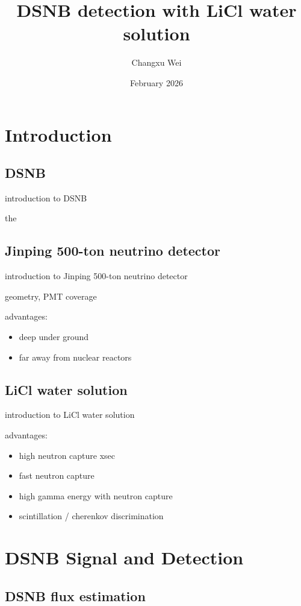 \documentclass[12pt]{article}
\title{DSNB detection with LiCl water solution}
\author{Changxu Wei}
\date{February 2026}
\begin{document}
\maketitle

\newpage
\tableofcontents

\newpage
\section{Introduction}
\subsection{DSNB}
introduction to DSNB

the

\subsection{Jinping 500-ton neutrino detector}
introduction to Jinping 500-ton neutrino detector

geometry, PMT coverage

advantages:
\begin{itemize}
    \item deep under ground
    \item far away from nuclear reactors
\end{itemize}

\subsection{LiCl water solution}
introduction to LiCl water solution

advantages:
\begin{itemize}
    \item high neutron capture xsec
    \item fast neutron capture
    \item high gamma energy with neutron capture
    \item scintillation / cherenkov discrimination
\end{itemize}

\newpage
\section{DSNB Signal and Detection}
\subsection{DSNB flux estimation}
\end{document}
